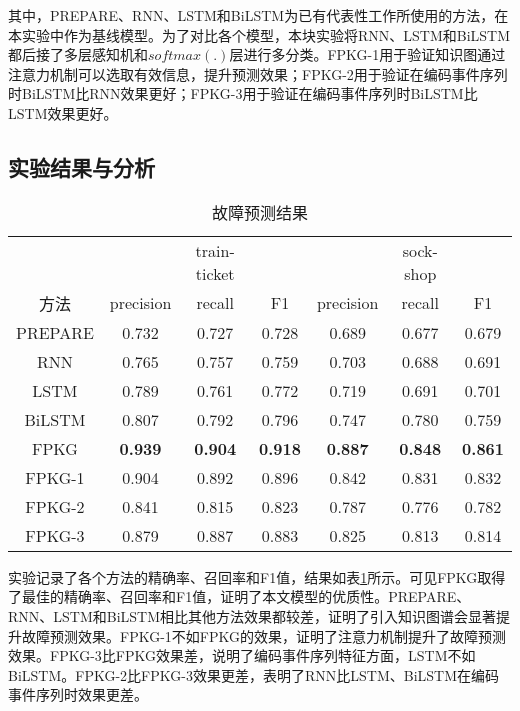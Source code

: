 其中，PREPARE、RNN、LSTM和BiLSTM为已有代表性工作所使用的方法，在本实验中作为基线模型。为了对比各个模型，本块实验将RNN、LSTM和BiLSTM都后接了多层感知机和$softmax(.)$层进行多分类。FPKG-1用于验证知识图通过注意力机制可以选取有效信息，提升预测效果；FPKG-2用于验证在编码事件序列时BiLSTM比RNN效果更好；FPKG-3用于验证在编码事件序列时BiLSTM比LSTM效果更好。

\subsection{实验结果与分析}
\begin{table}[htbp]
    \caption{故障预测结果}
    \centering
    \label{anom-predict}
    \begin{tabular}{ccccccc}
    \toprule[1.5pt]
               &                & train-ticket   &                &                & sock-shop      &                \\
    方法         & precision      & recall         & F1             & precision      & recall         & F1             \\ \midrule[1.5pt]
    PREPARE    & 0.732          & 0.727          & 0.728          & 0.689          & 0.677          & 0.679          \\
    RNN        & 0.765          & 0.757          & 0.759          & 0.703          & 0.688          & 0.691          \\
    LSTM       & 0.789          & 0.761          & 0.772          & 0.719          & 0.691          & 0.701          \\
    BiLSTM     & 0.807          & 0.792          & 0.796          & 0.747          & 0.780          & 0.759          \\
    FPKG       & \textbf{0.939} & \textbf{0.904} & \textbf{0.918} & \textbf{0.887} & \textbf{0.848} & \textbf{0.861} \\
    FPKG-1 & 0.904          & 0.892          & 0.896          & 0.842          & 0.831          & 0.832          \\
    FPKG-2 & 0.841          & 0.815          & 0.823          & 0.787          & 0.776          & 0.782          \\
    FPKG-3 & 0.879          & 0.887          & 0.883          & 0.825          & 0.813          & 0.814          \\ \bottomrule[1.5pt]
    \end{tabular}
    \end{table}

实验记录了各个方法的精确率、召回率和F1值，结果如表\ref{anom-predict}所示。可见FPKG取得了最佳的精确率、召回率和F1值，证明了本文模型的优质性。PREPARE、RNN、LSTM和BiLSTM相比其他方法效果都较差，证明了引入知识图谱会显著提升故障预测效果。FPKG-1不如FPKG的效果，证明了注意力机制提升了故障预测效果。FPKG-3比FPKG效果差，说明了编码事件序列特征方面，LSTM不如BiLSTM。FPKG-2比FPKG-3效果更差，表明了RNN比LSTM、BiLSTM在编码事件序列时效果更差。

